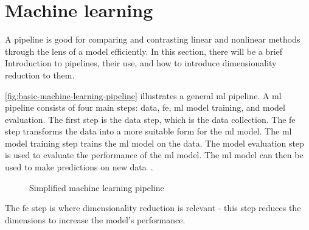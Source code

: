 \section{Machine learning}\label{sec:machine-learning}
A pipeline is good for comparing and contrasting linear and nonlinear methods through the lens of a model efficiently. In this section, there will be a brief Introduction to pipelines, their use, and how to introduce dimensionality reduction to them.

\autoref{fig:basic-machine-learning-pipeline} illustrates a general \gls{ml} pipeline. A \gls{ml} pipeline consists of four main steps: data, \gls{fe}, \gls{ml} model training, and model evaluation. The first step is the data step, which is the data collection. The \gls{fe} step transforms the data into a more suitable form for the \gls{ml} model. The \gls{ml} model training step trains the \gls{ml} model on the data. The model evaluation step is used to evaluate the performance of the \gls{ml} model. The \gls{ml} model can then be used to make predictions on new data~\cite{machine-learning-pipeline-architecture}.

\begin{figure}[htb!]
    \centering
    
    \caption{Simplified machine learning pipeline}
    \label{fig:basic-machine-learning-pipeline}
\end{figure}

The \gls{fe} step is where dimensionality reduction is relevant - this step reduces the dimensions to increase the model's performance.

